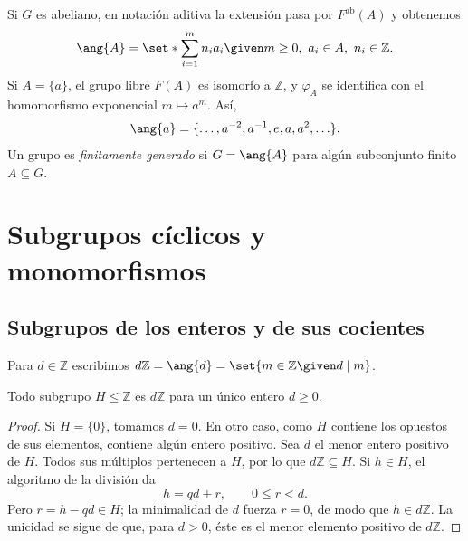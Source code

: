 Si $G$ es abeliano, en notación aditiva la extensión pasa por $F^{\mathrm{ab}}(A)$ y obtenemos
\[
\ang{A}=\set*{\sum_{i=1}^m n_i a_i\given
m\ge0,\ a_i\in A,\ n_i\in\mathbb Z}.
\]
Si $A=\{a\}$, el grupo libre $F(A)$ es isomorfo a $\mathbb Z$, y $\varphi_A$ se identifica con el homomorfismo exponencial $m\mapsto a^m$. Así,
\[
\ang{a}=\{\ldots,a^{-2},a^{-1},e,a,a^2,\ldots\}.
\]
Un grupo es \emph{finitamente generado} si $G=\ang{A}$ para algún subconjunto finito $A\subseteq G$.

\section{Subgrupos cíclicos y monomorfismos}
\subsection{Subgrupos de los enteros y de sus cocientes}
Para $d\in\mathbb Z$ escribimos $d\mathbb Z=\ang{d}=\set{m\in\mathbb Z\given d\mid m}$.

\begin{prop}\label{prop:C4-subgrupos-Z}
Todo subgrupo $H\le\mathbb Z$ es $d\mathbb Z$ para un único entero $d\ge0$.
\end{prop}
\begin{proof}
Si $H=\{0\}$, tomamos $d=0$. En otro caso, como $H$ contiene los opuestos de sus elementos, contiene algún entero positivo. Sea $d$ el menor entero positivo de $H$. Todos sus múltiplos pertenecen a $H$, por lo que $d\mathbb Z\subseteq H$. Si $h\in H$, el algoritmo de la división da
\[
h=qd+r,\qquad 0\le r<d.
\]
Pero $r=h-qd\in H$; la minimalidad de $d$ fuerza $r=0$, de modo que $h\in d\mathbb Z$. La unicidad se sigue de que, para $d>0$, éste es el menor elemento positivo de $d\mathbb Z$.
\end{proof}

